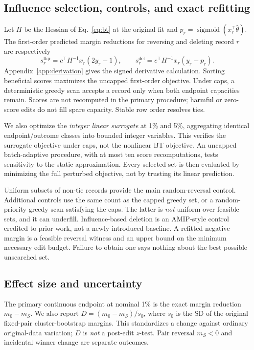 \documentclass{article}
\newcommand{\sigmoid}{\operatorname{sigmoid}}
\begin{document}
\subsection{Influence selection, controls, and exact refitting}
Let $H$ be the Hessian of Eq.~\eqref{eq:bt} at the original fit and $p_r=\sigmoid(x_r^\top\widehat\theta)$. The first-order predicted margin reductions for reversing and deleting record $r$ are respectively
\begin{equation}\label{eq:influence}
 s_r^{\mathrm{flip}}=c^\top H^{-1}x_r(2y_r-1),\qquad
 s_r^{\mathrm{del}}=c^\top H^{-1}x_r(y_r-p_r).
\end{equation}
Appendix~\ref{app:derivation} gives the signed derivative calculation. Sorting beneficial scores maximizes the uncapped first-order objective. Under caps, a deterministic greedy scan accepts a record only when both endpoint capacities remain. Scores are not recomputed in the primary procedure; harmful or zero-score edits do not fill spare capacity. Stable row order resolves ties.

We also optimize the \emph{integer linear surrogate} at 1\% and 5\%, aggregating identical endpoint/outcome classes into bounded integer variables. This verifies the surrogate objective under caps, not the nonlinear BT objective. An uncapped batch-adaptive procedure, with at most ten score recomputations, tests sensitivity to the static approximation. Every selected set is then evaluated by minimizing the full perturbed objective, not by trusting its linear prediction.

Uniform subsets of non-tie records provide the main random-reversal control. Additional controls use the same count as the capped greedy set, or a random-priority greedy scan satisfying the caps. The latter is \emph{not} uniform over feasible sets, and it can underfill. Influence-based deletion is an AMIP-style control credited to prior work, not a newly introduced baseline. A refitted negative margin is a feasible reversal witness and an upper bound on the minimum necessary edit budget. Failure to obtain one says nothing about the best possible unsearched set.

\subsection{Effect size and uncertainty}\label{sec:uncertainty}
The primary continuous endpoint at nominal 1\% is the exact margin reduction $m_0-m_S$. We also report $D=(m_0-m_S)/s_0$, where $s_0$ is the SD of the original fixed-pair cluster-bootstrap margins. This standardizes a change against ordinary original-data variation; $D$ is \emph{not} a post-edit $z$-test. Pair reversal $m_S<0$ and incidental winner change are separate outcomes.
\end{document}
